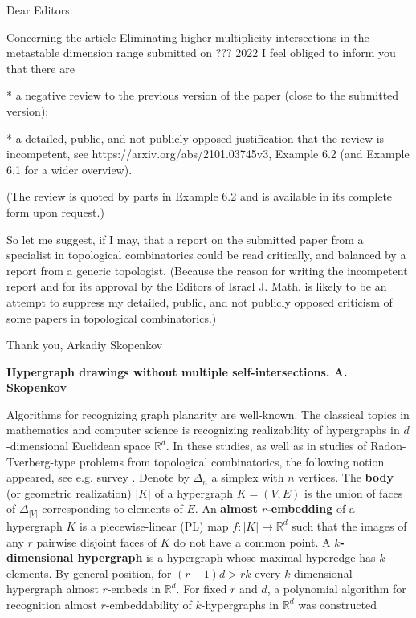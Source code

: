 \documentclass[12pt]{article}
\theoremstyle{plain}
\theoremstyle{definition}
\begin{document}
\comment

Dear Editors:

Concerning the article
Eliminating higher-multiplicity intersections in the metastable dimension range
submitted on ??? 2022 I feel obliged to inform you that there are

* a negative review to the previous version of the paper (close to the submitted version);

* a detailed, public, and not publicly opposed justification that the review is incompetent, see https://arxiv.org/abs/2101.03745v3, Example 6.2 (and Example 6.1 for a wider overview).

(The review is quoted by parts in Example 6.2 and is available in its complete form upon request.)

So let me suggest, if I may, that a report on the submitted paper from a specialist in topological combinatorics could be read critically, and balanced by a report from a generic topologist.
(Because the reason for writing the incompetent report and for its approval by the Editors of Israel J. Math. is likely to be an attempt to suppress my detailed, public, and not publicly opposed criticism of some papers in topological combinatorics.)

Thank you,
Arkadiy Skopenkov


{\bf Hypergraph drawings without multiple self-intersections. A. Skopenkov}

Algorithms for recognizing graph planarity are well-known.
The classical topics in mathematics and computer science is recognizing realizability of hypergraphs in $d$-dimensional Euclidean space $\mathbb R^d$.
In these studies, as well as in studies of Radon-Tverberg-type problems from topological combinatorics, the following notion appeared, see e.g. survey \cite{Sk18}.
Denote by $\Delta_n$ a simplex with $n$ vertices.
The {\bf body} (or geometric realization) $|K|$ of a hypergraph $K=(V,E)$ is the union of faces of $\Delta_{|V|}$ corresponding to elements of $E$.
An {\bf almost $r$-embedding} of a hypergraph $K$ is a piecewise-linear (PL) map $f\colon |K|\to \mathbb R^d$ such that the images of any $r$ pairwise disjoint faces of $K$ do not have a common point.
A {\bf $k$-dimensional hypergraph} is a hypergraph whose maximal hyperedge has $k$ elements.
By general position, for $(r-1)d>rk$ every $k$-dimensional hypergraph almost $r$-embeds in $\mathbb R^d$.
For fixed $r$ and $d$, a polynomial algorithm for recognition almost $r$-embeddability of $k$-hypergraphs in $\mathbb R^d$ was constructed
\end{document}
